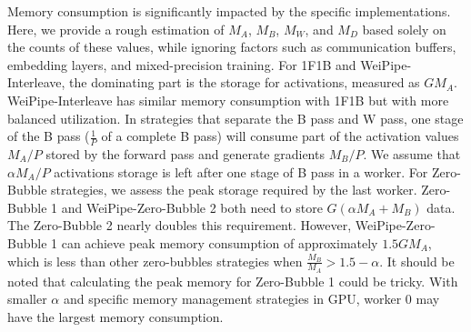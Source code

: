 \documentclass[sigplan,review,anonymous]{acmart}
\begin{document}
Memory consumption is significantly impacted by the specific implementations. Here, we provide a rough estimation of $M_A$, $M_B$, $M_W$, and $M_D$ based solely on the counts of these values, while ignoring factors such as communication buffers, embedding layers, and mixed-precision training. For 1F1B and WeiPipe-Interleave, the dominating part is the storage for activations, measured as $GM_A$. WeiPipe-Interleave has similar memory consumption with 1F1B but with more balanced utilization. In strategies that separate the B pass and W pass, one stage of the B pass ($\frac{1}{P}$ of a complete B pass) will consume part of the activation values $M_A/P$ stored by the forward pass and generate gradients $M_B/P$. We assume that $\alpha M_A/P$ activations storage is left after one stage of B pass in a worker. For Zero-Bubble strategies, we assess the peak storage required by the last worker. Zero-Bubble 1 and WeiPipe-Zero-Bubble 2 both need to store $G(\alpha M_A+M_B)$ data. The Zero-Bubble 2 nearly doubles this requirement. However, WeiPipe-Zero-Bubble 1 can achieve peak memory consumption of approximately $1.5GM_A$, which is less than other zero-bubbles strategies when $\frac{M_B}{M_A} > 1.5-\alpha $. It should be noted that calculating the peak memory for Zero-Bubble 1 could be tricky. With smaller $\alpha$ and specific memory management strategies in GPU, worker 0 may have the largest memory consumption. 






\end{document}
